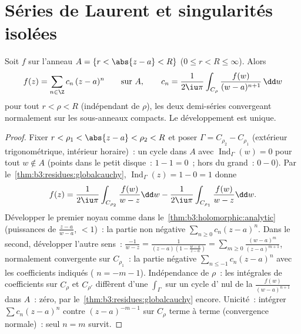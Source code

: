 \section{Séries de Laurent et singularités isolées}

\begin{theorem}\label{thm:b3:residues:laurent}
Soit $f$  sur l'anneau $A = \{r < \abs{z - a} <
R\}$ ($0 \leq r < R \leq \infty$). Alors
\[
f(z) = \sum_{n\in\Z}c_n\,(z - a)^n
\qquad\text{sur } A,
\qquad
c_n = \frac1{2\iu\pi}\int_{C_\rho}\frac{f(w)}{(w -
a)^{n+1}}\,\dd w
\]
pour tout $r < \rho < R$ (indépendant de $\rho$), les deux
demi-séries convergeant normalement sur les sous-anneaux
compacts. Le développement est unique.
\end{theorem}

\begin{proof}
Fixer $r < \rho_1 < \abs{z - a} < \rho_2 < R$ et poser
$\Gamma = C_{\rho_2} - C_{\rho_1}$ (extérieur
trigonométrique, intérieur horaire)~: un cycle dans $A$ avec
$\operatorname{Ind}_\Gamma(w) = 0$ pour tout $w \notin A$
(points dans le petit disque~: $1 - 1 = 0$~; hors du grand~:
$0 - 0$). Par le~\cref{thm:b3:residues:globalcauchy},
$\operatorname{Ind}_\Gamma(z) = 1 - 0 = 1$ donne
\[
f(z) = \frac1{2\iu\pi}\int_{C_{\rho_2}}\frac{f(w)}{w - z}\dd
w - \frac1{2\iu\pi}\int_{C_{\rho_1}}\frac{f(w)}{w - z}\dd w .
\]
Développer le premier noyau comme dans
le~\cref{thm:b3:holomorphic:analytic} (puissances de
$\frac{z - a}{w - a}$,  $< 1$)~: la partie non négative
$\sum_{n\geq0}c_n(z-a)^n$. Dans le second, développer
l'autre sens~: $\frac{-1}{w - z} = \frac1{(z-a)(1 - \frac{w -
a}{z - a})} = \sum_{m\geq0}\frac{(w-a)^m}{(z - a)^{m+1}}$,
normalement convergente sur $C_{\rho_1}$~: la partie négative
$\sum_{n\leq-1}c_n(z-a)^n$ avec les coefficients indiqués
( $n = -m-1$). Indépendance de $\rho$~: les intégrales
de coefficients sur $C_{\rho}$ et $C_{\rho'}$ diffèrent d'une
$\int_\Gamma$ sur un cycle d' nul de la  $\frac{f(w)}{(w-a)^{n+1}}$ dans $A$~: zéro, par
le~\cref{thm:b3:residues:globalcauchy} encore. Unicité~:
intégrer $\sum c_n(z-a)^n$ contre $(z - a)^{-m-1}$ sur
$C_\rho$ terme à terme (convergence normale)~: seul $n = m$
survit.
\end{proof}

